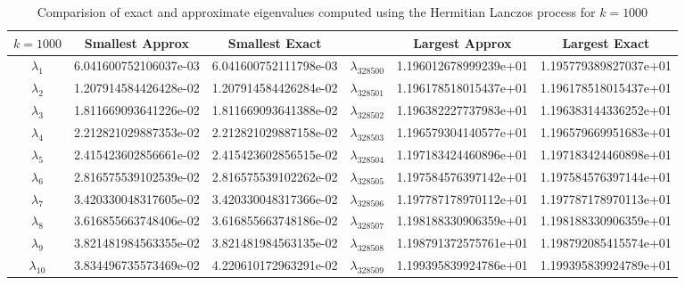 \documentclass[12pt]{article}
\begin{document}
\begin{itemize}
\begin{table}[H]
\renewcommand{\arraystretch}{1.5}
\begin{small}
\hspace{-.95in}
\begin{tabular}{| c | c | c || c | c | c |}
\hline
$k = 1000$ &  \textbf{Smallest Approx} & \textbf{Smallest Exact} &   & \textbf{Largest Approx} & \textbf{Largest Exact}\\
\hline 
\hline
$\lambda_1$  & 6.041600752106037e-03  & 6.041600752111798e-03  & $\lambda_{328500}$  & 1.196012678999239e+01  &  1.195779389827037e+01 \\
$\lambda_2$  & 1.207914584426428e-02  &  1.207914584426284e-02 & $\lambda_{328501}$  & 1.196178518015437e+01  &  1.196178518015437e+01 \\
$\lambda_3$  &  1.811669093641226e-02 &  1.811669093641388e-02 & $\lambda_{328502}$  & 1.196382227737983e+01  &  1.196383144336252e+01 \\
$\lambda_4$  &  2.212821029887353e-02 & 2.212821029887158e-02  & $\lambda_{328503}$  & 1.196579304140577e+01  &  1.196579669951683e+01 \\
$\lambda_5$  & 2.415423602856661e-02  & 2.415423602856515e-02  & $\lambda_{328504}$  & 1.197183424460896e+01  &  1.197183424460898e+01 \\
$\lambda_6$  & 2.816575539102539e-02  & 2.816575539102262e-02  & $\lambda_{328505}$  & 1.197584576397142e+01  &  1.197584576397144e+01 \\
$\lambda_7$  & 3.420330048317605e-02  & 3.420330048317366e-02  & $\lambda_{328506}$  & 1.197787178970112e+01  &  1.197787178970113e+01 \\
$\lambda_8$  & 3.616855663748406e-02  & 3.616855663748186e-02  & $\lambda_{328507}$  & 1.198188330906359e+01  &  1.198188330906359e+01 \\
$\lambda_9$  & 3.821481984563355e-02  & 3.821481984563135e-02  & $\lambda_{328508}$  & 1.198791372575761e+01  &  1.198792085415574e+01 \\
$\lambda_{10}$  & 3.834496735573469e-02  & 4.220610172963291e-02  & $\lambda_{328509}$  & 1.199395839924786e+01  &  1.199395839924789e+01 \\
\hline
\end{tabular}
\end{small}
\caption{Comparision of exact and approximate eigenvalues computed using the Hermitian Lanczos process for $k = 1000$}
\end{table} 


\end{itemize}
\end{document}
